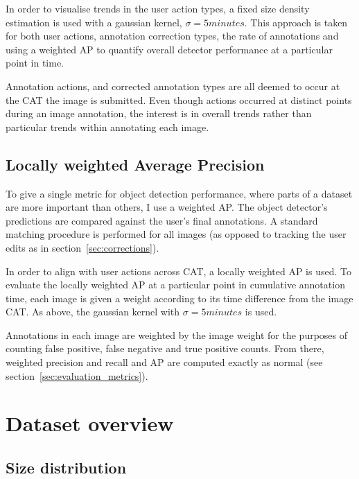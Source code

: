 In order to visualise trends in the user action types, a fixed size density estimation is used with a gaussian kernel, $\sigma=5 minutes$. This approach is taken for both user actions, annotation correction types, the rate of annotations and using a weighted \gls{AP} to quantify overall detector performance at a particular point in  time.

Annotation actions, and corrected annotation types are all deemed to occur at the \gls{CAT} the image is submitted. Even though actions occurred at distinct points during an image annotation, the interest is in overall trends rather than particular trends within annotating each image. 

\subsection {Locally weighted Average Precision}
\label{sec:noisy_trends}

To give a single metric for object detection performance, where parts of a dataset are more important than others, I use a weighted \gls{AP}. The object detector's predictions are compared against the user's final annotations. A standard matching procedure is performed for all images (as opposed to tracking the user edits as in section~\ref{sec:corrections}).

In order to align with user actions across \gls{CAT}, a locally weighted \gls{AP} is used. To evaluate the locally weighted \gls{AP} at a particular point in cumulative annotation time, each image is given a weight according to its time difference from the image \gls{CAT}. As above, the gaussian kernel with $\sigma=5 minutes$ is used.

Annotations in each image are weighted by the image weight for the purposes of counting false positive, false negative and true positive counts. From there, weighted precision and recall and \gls{AP} are computed exactly as normal (see section~\ref{sec:evaluation_metrics}).


\section {Dataset overview}
\subsection {Size distribution}

